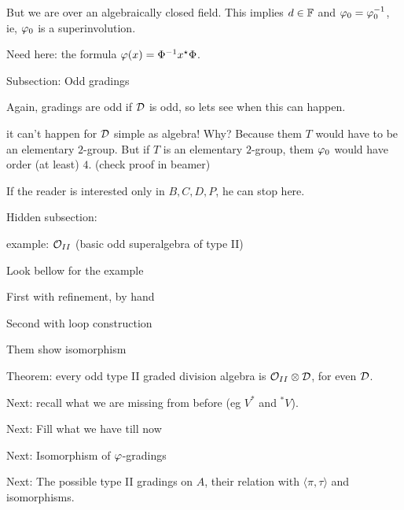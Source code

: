 \documentclass{amsbook}
\begin{document}
\begin{todolist}
        \item But we are over an algebraically closed field. This implies $d \in \mathbb{F}$ and $\varphi_0 = \varphi_0^{-1}$, ie, $\varphi_0$ is a superinvolution.
        
        \item Need here: the formula $\varphi(x) = \Phi^{-1} x^\star \Phi$.
        
        \item Subsection: Odd gradings
        
        \item Again, gradings are odd if $\mathcal{D}$ is odd, so lets see when this can happen.
        
        \item it can't happen for $\mathcal{D}$ simple as algebra! Why? Because them $T$ would have to be an elementary $2$-group. But if $T$ is an elementary $2$-group, them $\varphi_0$ would have order (at least) $4$. (check proof in beamer)
        
        \item If the reader is interested only in $B, C, D, P$, he can stop here.
        
        \item Hidden subsection:
        
        \item example: $\mathcal O_{II}$ (basic odd superalgebra of type II)
        
        \item Look bellow for the example
        
        \item First with refinement, by hand
        
        \item Second with loop construction
        
        \item Them show isomorphism
        
        \item Theorem: every odd type II graded division algebra is $\mathcal O_{II} \otimes \mathcal{D}$, for even $\mathcal{D}$.
        
        \item Next: recall what we are missing from before (eg $V^*$ and $^* V$).
        
        \item Next: Fill what we have till now
        
        \item Next: Isomorphism of $\varphi$-gradings
        
        \item Next: The possible type II gradings on $A$, their relation with $\langle \pi, \tau\rangle$ and isomorphisms.
        
    \end{todolist}
\end{document}
